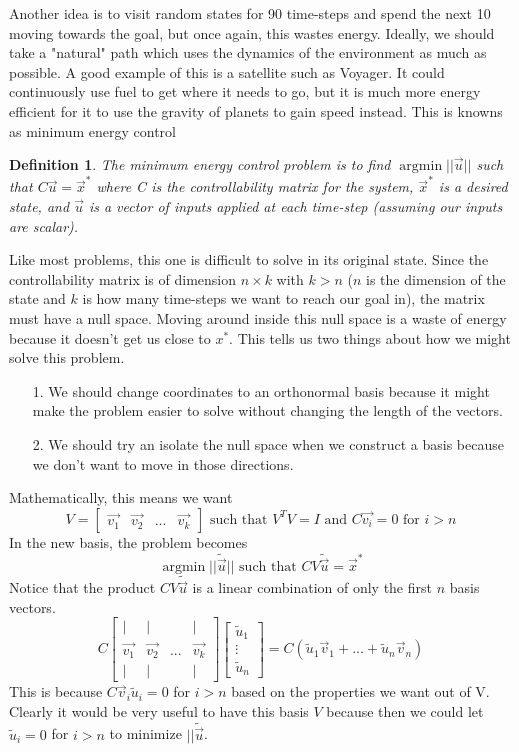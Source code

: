 \documentclass{article}
\newtheorem{definition}{Definition}
\DeclareMathOperator*{\argmin}{argmin}
\begin{document}
Another idea is to visit random states for 90 time-steps and spend the next 10 moving towards the goal, but once again, this wastes energy.
Ideally, we should take a "natural" path which uses the dynamics of the environment as much as possible.
A good example of this is a satellite such as Voyager. It could continuously use fuel to get where it needs to go, but it is much more energy efficient for it to use the gravity of planets to gain speed instead.
This is knowns as minimum energy control
\begin{definition}
    The minimum energy control problem is to find $\argmin{||\vec{u}||}$ such that $C\vec{u}=\vec{x}^*$ where 
    C is the controllability matrix for the system, $\vec{x}^*$ is a desired state, and $\vec{u}$ is a vector of inputs applied at each time-step (assuming our inputs are scalar).
\end{definition}
Like most problems, this one is difficult to solve in its original state. Since the controllability matrix is of dimension $n \times k$ with $k > n$ ($n$ is the dimension of the state and $k$ is how many time-steps we want to reach our goal in), 
the matrix must have a null space. Moving around inside this null space is a waste of energy because it doesn't get us close to $x^*$. This tells us two things about how we might solve this problem.
\begin{itemize}
    \item[1. ] We should change coordinates to an orthonormal basis because it might make the problem easier to solve without changing the length of the vectors.
    \item[2. ] We should try an isolate the null space when we construct a basis because we don't want to move in those directions.  
\end{itemize}
Mathematically, this means we want
\[
    V = \left[
        \begin{array}{cccc}
            \vec{v_1} & \vec{v_2} & ... & \vec{v_k}
        \end{array}
    \right] \text{ such that } V^TV=I \text{ and } C\vec{v_i} = 0\text{ for } i > n
\]
In the new basis, the problem becomes
\[
    \argmin{||\tilde{\vec{u}}||} \text{ such that } CV\tilde{\vec{u}}=\vec{x}^*
\]
Notice that the product $CV\tilde{\vec{u}}$ is a linear combination of only the first $n$ basis vectors.
\[
    C \left[
        \begin{array}{cccc}
            | & | & & |\\
            \vec{v_1} & \vec{v_2} & ... & \vec{v_k}\\
            | & | & & |
        \end{array}
    \right] \left[
        \begin{array}{c}
            \tilde{u}_1\\
            \vdots\\
            \tilde{u}_n
        \end{array}
    \right] = C (\tilde{u}_1\vec{v}_1+...+\tilde{u}_n\vec{v}_n)
\]
This is because $C\vec{v}_i\tilde{u}_i=0$ for $i>n$ based on the properties we want out of V.
Clearly it would be very useful to have this basis $V$ because then we could let $\tilde{u}_i=0$ for $i > n$ to minimize $||\tilde{\vec{u}}$.
\end{document}
